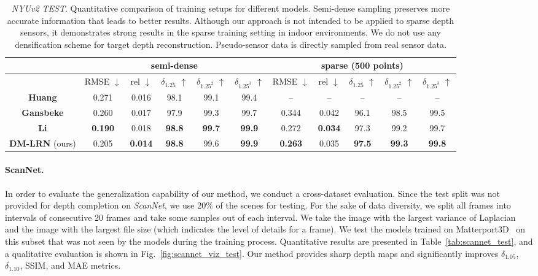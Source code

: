 \documentclass[final]{cvpr}
\begin{document}
    \begin{table*}[ht]
    \setlength{\tabcolsep}{5pt}
    \renewcommand{\arraystretch}{1.0}
    \centering
	\begin{tabular}{|c|c|c|c|c|c|c|c|c|c|c|}
	    \hline
	    & \multicolumn{5}{|c}{semi-dense} & \multicolumn{5}{|c}{sparse (500 points)} \vline\\
	    \hline
	    & RMSE $\downarrow$ & rel $\downarrow$ & $\delta_{1.25}$ $\uparrow$ & $\delta_{1.25^2}$ $\uparrow$ & $\delta_{1.25^3}$ $\uparrow$ & RMSE $\downarrow$ & rel $\downarrow$ & $\delta_{1.25}$ $\uparrow$ & $\delta_{1.25^2}$ $\uparrow$ & $\delta_{1.25^3}$ $\uparrow$ \\
		\hline
		\hline
		\textbf{Huang \etal \cite{Huang_2019}} & 0.271 & 0.016 & 98.1 & 99.1 & 99.4 & -- & -- & -- & -- & -- \\
		\textbf{Gansbeke} \etal \cite{wvangansbeke_depth_2019} & 0.260 & 0.017 & 97.9 & 99.3 & 99.7 & 0.344 & 0.042 & 96.1 & 98.5 & 99.5 \\
		\textbf{Li} \etal \cite{msg_chn} & \textbf{0.190} & 0.018 & \textbf{98.8} & \textbf{99.7} & \textbf{99.9} & 0.272 & \textbf{0.034} & 97.3 & 99.2 & 99.7 \\
		\hline
		\textbf{DM-LRN} (ours) & 0.205 & \textbf{0.014} & \textbf{98.8} & 99.6 & \textbf{99.9} & \textbf{0.263} & 0.035 & \textbf{97.5} & \textbf{99.3} & \textbf{99.8} \\
		\hline
	\end{tabular}
	\vspace{0.1cm}
	\caption{\emph{NYUv2 TEST}. Quantitative comparison of training setups for different models. Semi-dense sampling preserves more accurate information that leads to better results. Although our approach is not intended to be applied to sparse depth sensors, it demonstrates strong results in the sparse training setting in indoor environments. We do not use any densification scheme for target depth reconstruction. Pseudo-sensor data is directly sampled from real sensor data.}
	\label{tab:nyu_test}
    \end{table*}
    
    \paragraph{ScanNet.} 
In order to evaluate the generalization capability of our method, we conduct a cross-dataset evaluation. Since the test split was not provided for depth completion on \emph{ScanNet}, we use 20\% of the scenes for testing. For the sake of data diversity, we split all frames into intervals of consecutive 20 frames and take some samples out of each interval. We take the image with the largest variance of Laplacian~\cite{blurdetection} and the image with the largest file size (which indicates the level of details for a frame). We test the models trained on Matterport3D~\cite{Matterport3D} on this subset that was not seen by the models during the training process. Quantitative results are presented in Table~\ref{tab:scannet_test}, and a qualitative evaluation is shown in Fig.~\ref{fig:scannet_viz_test}. Our method provides sharp depth maps and significantly improves $\delta_{1.05}$, $\delta_{1.10}$, SSIM, and MAE metrics.
    
\end{document}
